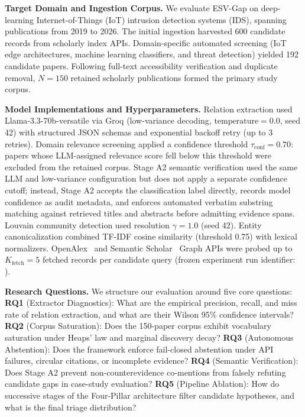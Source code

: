 \documentclass[runningheads]{llncs}
\newcommand{\method}{ESV-Gap}
\begin{document}
\noindent\textbf{Target Domain and Ingestion Corpus.} We evaluate \method{} on deep-learning Internet-of-Things (IoT) intrusion detection systems (IDS), spanning publications from 2019 to 2026. The initial ingestion harvested 600 candidate records from scholarly index APIs. Domain-specific automated screening (IoT edge architectures, machine learning classifiers, and threat detection) yielded 192 candidate papers. Following full-text accessibility verification and duplicate removal, $N = 150$ retained scholarly publications formed the primary study corpus.

\noindent\textbf{Model Implementations and Hyperparameters.} Relation extraction used Llama-3.3-70b-versatile via Groq (low-variance decoding, $\text{temperature} = 0.0$, seed 42) with structured JSON schemas and exponential backoff retry (up to 3 retries). Domain relevance screening applied a confidence threshold $\tau_{\text{conf}} = 0.70$: papers whose LLM-assigned relevance score fell below this threshold were excluded from the retained corpus. Stage A2 semantic verification used the same LLM and low-variance configuration but does not apply a separate confidence cutoff; instead, Stage A2 accepts the classification label directly, records model confidence as audit metadata, and enforces automated verbatim substring matching against retrieved titles and abstracts before admitting evidence spans. Louvain community detection used resolution $\gamma = 1.0$ (seed 42). Entity canonicalization combined TF-IDF cosine similarity (threshold 0.75) with lexical normalizers. OpenAlex~\cite{openalex2022} and Semantic Scholar~\cite{semanticscholar2023} Graph APIs were probed up to $K_{\text{fetch}} = 5$ fetched records per candidate query (frozen experiment run identifier: ).

\noindent\textbf{Research Questions.} We structure our evaluation around five core questions: \textbf{RQ1} (Extractor Diagnostics): What are the empirical precision, recall, and miss rate of relation extraction, and what are their Wilson 95\% confidence intervals? \textbf{RQ2} (Corpus Saturation): Does the 150-paper corpus exhibit vocabulary saturation under Heaps' law and marginal discovery decay? \textbf{RQ3} (Autonomous Abstention): Does the framework enforce fail-closed abstention under API failures, circular citations, or incomplete evidence? \textbf{RQ4} (Semantic Verification): Does Stage A2 prevent non-counterevidence co-mentions from falsely refuting candidate gaps in case-study evaluation? \textbf{RQ5} (Pipeline Ablation): How do successive stages of the Four-Pillar architecture filter candidate hypotheses, and what is the final triage distribution?
\end{document}
